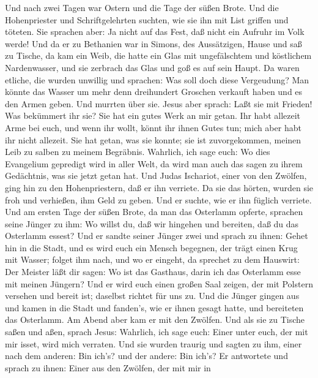  Und nach zwei Tagen war Ostern und die Tage der süßen
Brote. Und die Hohenpriester und Schriftgelehrten suchten, wie sie ihn
mit List griffen und töteten.  Sie sprachen aber: Ja nicht
auf das Fest, daß nicht ein Aufruhr im Volk werde!  Und da
er zu Bethanien war in Simons, des Aussätzigen, Hause und saß zu Tische,
da kam ein Weib, die hatte ein Glas mit ungefälschtem und köstlichem
Nardenwasser, und sie zerbrach das Glas und goß es auf sein Haupt.
 Da waren etliche, die wurden unwillig und sprachen: Was
soll doch diese Vergeudung?  Man könnte das Wasser um mehr
denn dreihundert Groschen verkauft haben und es den Armen geben. Und
murrten über sie.  Jesus aber sprach: Laßt sie mit Frieden!
Was bekümmert ihr sie? Sie hat ein gutes Werk an mir getan. 
Ihr habt allezeit Arme bei euch, und wenn ihr wollt, könnt ihr ihnen
Gutes tun; mich aber habt ihr nicht allezeit.  Sie hat
getan, was sie konnte; sie ist zuvorgekommen, meinen Leib zu salben zu
meinem Begräbnis.  Wahrlich, ich sage euch: Wo dies
Evangelium gepredigt wird in aller Welt, da wird man auch das sagen zu
ihrem Gedächtnis, was sie jetzt getan hat.  Und Judas
Ischariot, einer von den Zwölfen, ging hin zu den Hohenpriestern, daß er
ihn verriete.  Da sie das hörten, wurden sie froh und
verhießen, ihm Geld zu geben. Und er suchte, wie er ihn füglich
verriete.  Und am ersten Tage der süßen Brote, da man das
Osterlamm opferte, sprachen seine Jünger zu ihm: Wo willst du, daß wir
hingehen und bereiten, daß du das Osterlamm essest?  Und er
sandte seiner Jünger zwei und sprach zu ihnen: Gehet hin in die Stadt,
und es wird euch ein Mensch begegnen, der trägt einen Krug mit Wasser;
folget ihm nach,  und wo er eingeht, da sprechet zu dem
Hauswirt: Der Meister läßt dir sagen: Wo ist das Gasthaus, darin ich das
Osterlamm esse mit meinen Jüngern?  Und er wird euch einen
großen Saal zeigen, der mit Polstern versehen und bereit ist; daselbst
richtet für uns zu.  Und die Jünger gingen aus und kamen in
die Stadt und fanden's, wie er ihnen gesagt hatte, und bereiteten das
Osterlamm.  Am Abend aber kam er mit den Zwölfen.
 Und als sie zu Tische saßen und aßen, sprach Jesus:
Wahrlich, ich sage euch: Einer unter euch, der mit mir isset, wird mich
verraten.  Und sie wurden traurig und sagten zu ihm, einer
nach dem anderen: Bin ich's? und der andere: Bin ich's?  Er
antwortete und sprach zu ihnen: Einer aus den Zwölfen, der mit mir in
